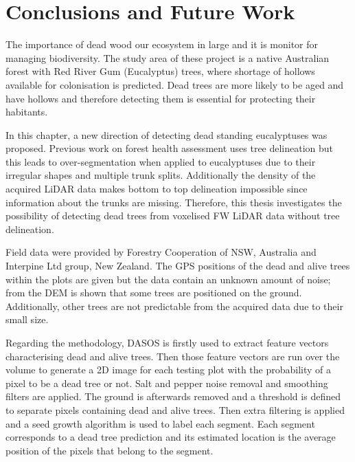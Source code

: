 \documentclass{subfiles}
\begin{document}
		
\section{Conclusions and Future Work}

\par The importance of dead wood our ecosystem in large and it is monitor for managing biodiversity. The study area of these project is a native Australian forest with Red River Gum (Eucalyptus) trees, where shortage of hollows available for colonisation is predicted. Dead trees are more likely to be aged and have hollows and therefore detecting them is essential for protecting their habitants. 



\par In this chapter, a new direction of detecting dead standing eucalyptuses was proposed. Previous work on forest health assessment uses tree delineation but this leads to over-segmentation when applied to eucalyptuses due to their irregular shapes and multiple trunk splits. Additionally the density of the acquired LiDAR data makes bottom to top delineation impossible since information about the trunks are missing. Therefore, this thesis investigates the possibility of detecting dead trees from voxelised FW LiDAR data without tree delineation. 

\par Field data were provided by Forestry Cooperation of NSW, Australia and Interpine Ltd group, New Zealand. The GPS positions of the dead and alive trees within the plots are given but the data contain an unknown amount of noise; from the DEM is shown that some trees are positioned on the ground. Additionally, other trees are not predictable from the acquired data due to their small size. 

\par Regarding the methodology, DASOS is firstly used to extract feature vectors characterising dead and alive trees. Then those feature vectors are run over the volume to generate a 2D image for each testing plot with the probability of a pixel to be a dead tree or not. Salt and pepper noise removal and smoothing filters are applied. The ground is afterwards removed and a threshold is defined to separate pixels containing dead and alive trees. Then extra filtering is applied and a seed growth algorithm is used to label each segment. Each segment corresponds to a dead tree prediction and its estimated location is the average position of the pixels that belong to the segment. 
\end{document}
